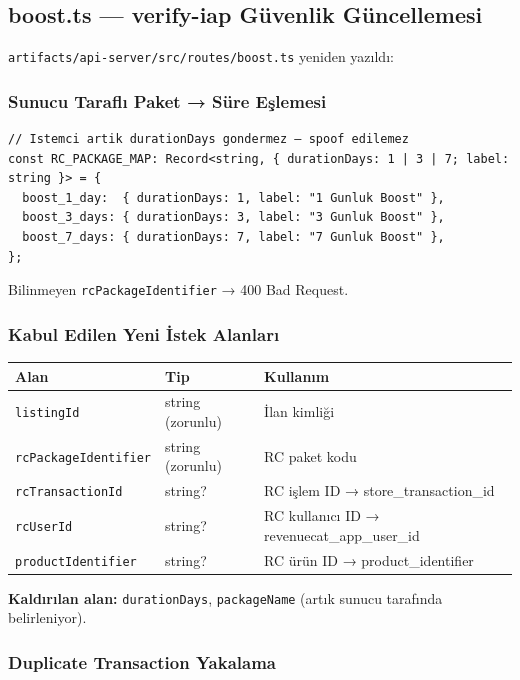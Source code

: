 \documentclass[12pt,a4paper]{article}
\begin{document}
\subsection{boost.ts — verify-iap Güvenlik Güncellemesi}

\texttt{artifacts/api-server/src/routes/boost.ts} yeniden yazıldı:

\subsubsection{Sunucu Taraflı Paket → Süre Eşlemesi}

\begin{lstlisting}[language={}]
// Istemci artik durationDays gondermez — spoof edilemez
const RC_PACKAGE_MAP: Record<string, { durationDays: 1 | 3 | 7; label: string }> = {
  boost_1_day:  { durationDays: 1, label: "1 Gunluk Boost" },
  boost_3_days: { durationDays: 3, label: "3 Gunluk Boost" },
  boost_7_days: { durationDays: 7, label: "7 Gunluk Boost" },
};
\end{lstlisting}

Bilinmeyen \texttt{rcPackageIdentifier} → 400 Bad Request.

\subsubsection{Kabul Edilen Yeni İstek Alanları}

\begin{center}
\begin{tabular}{lll}
  \toprule
  \textbf{Alan} & \textbf{Tip} & \textbf{Kullanım}\\
  \midrule
  \texttt{listingId}           & string (zorunlu) & İlan kimliği\\
  \texttt{rcPackageIdentifier} & string (zorunlu) & RC paket kodu\\
  \texttt{rcTransactionId}     & string? & RC işlem ID → store\_transaction\_id\\
  \texttt{rcUserId}            & string? & RC kullanıcı ID → revenuecat\_app\_user\_id\\
  \texttt{productIdentifier}   & string? & RC ürün ID → product\_identifier\\
  \bottomrule
\end{tabular}
\end{center}

\textbf{Kaldırılan alan:} \texttt{durationDays}, \texttt{packageName}
(artık sunucu tarafında belirleniyor).

\subsubsection{Duplicate Transaction Yakalama}
\end{document}
